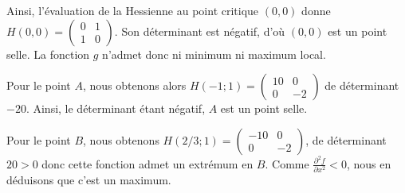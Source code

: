 {\begin{enumerate}
{Ainsi, l'évaluation de la Hessienne au point critique $(0,0)$ donne $H(0,0)=\begin{pmatrix} 0  & 1\\ 1&0\end{pmatrix}$. Son déterminant est négatif, d'où $(0,0)$ est un point selle. 
La fonction $g$ n'admet donc ni minimum ni maximum local. 

Pour le point $A$, nous obtenons alors $H(-1;1)= \begin{pmatrix} 10 & 0 \\ 0 & -2\end{pmatrix}$ de déterminant 
$-20$. Ainsi, le déterminant étant négatif, $A$ est un point selle. 

Pour le point $B$, nous obtenons 
$H(2/3;1) = \begin{pmatrix} -10 & 0 \\ 0 & -2\end{pmatrix}$, de déterminant $20>0$ donc cette fonction admet un extrémum en $B$.  Comme $\frac{\partial^2 f}{\partial x^2}<0$, nous en déduisons que c'est un maximum. 



}
\end{enumerate}
} 